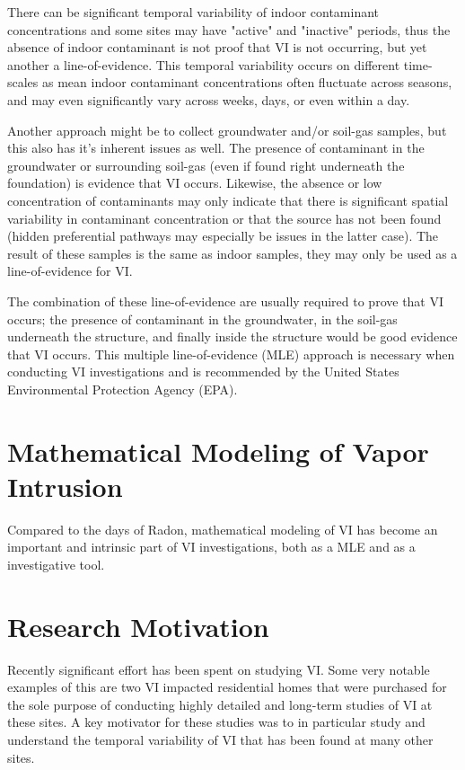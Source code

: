 \documentclass[../thesis.tex]{subfiles}
\begin{document}
There can be significant temporal variability of indoor contaminant concentrations and some sites may have "active" and "inactive" periods, thus the absence of indoor contaminant is not proof that VI is not occurring, but yet another a line-of-evidence.
This temporal variability occurs on different time-scales as mean indoor contaminant concentrations often fluctuate across seasons, and may even significantly vary across weeks, days, or even within a day.

Another approach might be to collect groundwater and/or soil-gas samples, but this also has it's inherent issues as well.
The presence of contaminant in the groundwater or surrounding soil-gas (even if found right underneath the foundation) is evidence that VI occurs.
Likewise, the absence or low concentration of contaminants may only indicate that there is significant spatial variability in contaminant concentration or that the source has not been found (hidden preferential pathways may especially be issues in the latter case).
The result of these samples is the same as indoor samples, they may only be used as a line-of-evidence for VI.

The combination of these line-of-evidence are usually required to prove that VI occurs; the presence of contaminant in the groundwater, in the soil-gas underneath the structure, and finally inside the structure would be good evidence that VI occurs.
This multiple line-of-evidence (MLE) approach is necessary when conducting VI investigations and is recommended by the United States Environmental Protection Agency (EPA).

\section{Mathematical Modeling of Vapor Intrusion}

Compared to the days of Radon, mathematical modeling of VI has become an important and intrinsic part of VI investigations, both as a MLE and as a investigative tool.

\section{Research Motivation}

Recently significant effort has been spent on studying VI.
Some very notable examples of this are two VI impacted residential homes that were purchased for the sole purpose of conducting highly detailed and long-term studies of VI at these sites.
A key motivator for these studies was to in particular study and understand the temporal variability of VI that has been found at many other sites.\par
\end{document}

